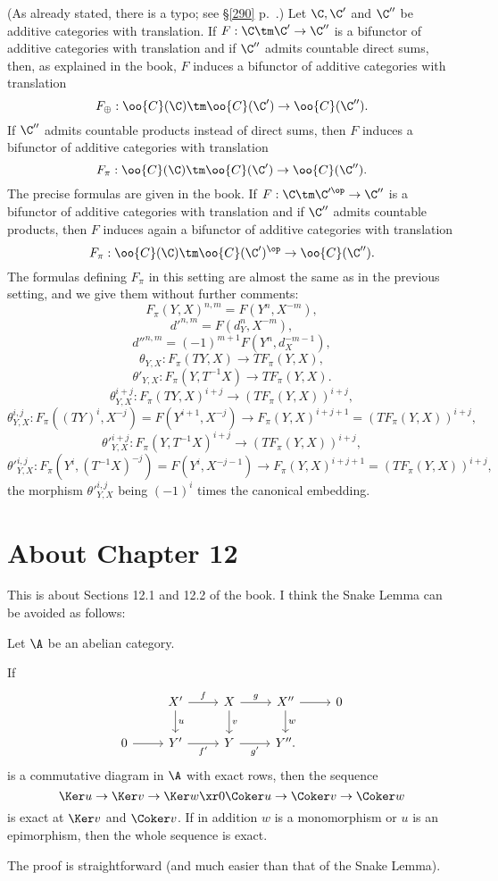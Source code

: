 \documentclass[12pt]{article}
\theoremstyle{remark}
\theoremstyle{definition}
\begin{document}
(As already stated, there is a typo; see \S\ref{290} p.~.) Let $\C,\C'$ and $\C''$ be additive categories with translation. If $F:\C\tm\C'\to\C''$ is a bifunctor of additive categories with translation and if $\C''$ admits countable direct sums, then, as explained in the book, $F$ induces a bifunctor of additive categories with translation 
$$
F_\oplus:\oo{C}(\C)\tm\oo{C}(\C')\to\oo{C}(\C'').
$$ 
If $\C''$ admits countable products instead of direct sums, then $F$ induces a bifunctor of additive categories with translation 
$$
F_\pi:\oo{C}(\C)\tm\oo{C}(\C')\to\oo{C}(\C'').
$$ 
The precise formulas are given in the book. If $F:\C\tm\C'^\op\to\C''$ is a bifunctor of additive categories with translation and if $\C''$ admits countable products, then $F$ induces again a bifunctor of additive categories with translation 
$$
F_\pi:\oo{C}(\C)\tm\oo{C}(\C')^{\op}\to\oo{C}(\C'').
$$ 
The formulas defining $F_\pi$ in this setting are almost the same as in the previous setting, and we give them without further comments:
$$
F_\pi(Y,X)^{n,m}=F(Y^n,X^{-m}),
$$
$$
d'^{n,m}=F(d_Y^n,X^{-m}),
$$
$$
d''^{n,m}=(-1)^{m+1}F(Y^n,d_X^{-m-1}),
$$
$$
\theta_{Y,X}:F_\pi(TY,X)\to TF_\pi(Y,X),
$$
$$
\theta'_{Y,X}:F_\pi(Y,T^{-1}X)\to TF_\pi(Y,X).
$$
$$
\theta_{Y,X}^{i+j}:F_\pi(TY,X)^{i+j}\to(TF_\pi(Y,X))^{i+j},
$$
$$
\theta_{Y,X}^{i,j}:F_\pi((TY)^i,X^{-j})=F(Y^{i+1},X^{-j})\to F_\pi(Y,X)^{i+j+1}=(TF_\pi(Y,X))^{i+j},
$$
$$
{\theta'}_{Y,X}^{i+j}:F_\pi(Y,T^{-1}X)^{i+j}\to(TF_\pi(Y,X))^{i+j},
$$
$$
{\theta'}_{Y,X}^{i,j}:F_\pi(Y^i,(T^{-1}X)^{-j})=F(Y^i,X^{-j-1})\to F_\pi(Y,X)^{i+j+1}=(TF_\pi(Y,X))^{i+j},
$$
the morphism ${\theta'}_{Y,X}^{i,j}$ being $(-1)^i$ times the canonical embedding. 


\section{About Chapter 12}

  

This is about Sections 12.1 and 12.2 of the book. I think the Snake Lemma can be avoided as follows: 

Let $\A$ be an abelian category. 

\begin{lem}
If 
$$
\begin{tikzcd}
{}&X'\ar{d}{u}\ar{r}{f}&X\ar{d}{v}\ar{r}{g}&X''\ar{d}{w}\ar{r}&0\\ 
0\ar{r}&Y'\ar{r}[swap]{f'}&Y\ar{r}[swap]{g'}&Y''.
\end{tikzcd}
$$ 
is a commutative diagram in $\A$ with exact rows, then the sequence 
$$
\Ker u\to\Ker v\to\Ker w\xr0\Coker u\to\Coker v\to\Coker w
$$
is exact at $\Ker v$ and $\Coker v$. If in addition $w$ is a monomorphism or $u$ is an epimorphism, then the whole sequence is exact.
\end{lem}
%
The proof is straightforward (and much easier than that of the Snake Lemma). 
\end{document}
